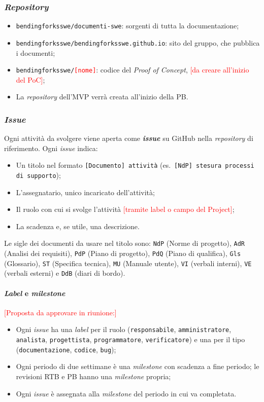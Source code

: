 \documentclass[12pt,a4paper]{article}
\newcommand{\ph}[1]{\textcolor{red}{[#1]}}
\newcommand{\tightlist}{\setlength{\itemsep}{1pt}\setlength{\parskip}{0pt}}
\begin{document}
\subsubsection{\emph{Repository}}\label{sec:repository}
\begin{itemize}
\tightlist
\item \texttt{bendingforksswe/documenti-swe}: sorgenti di tutta la documentazione;
\item \texttt{bendingforksswe/bendingforksswe.github.io}: sito del gruppo, che pubblica i documenti;
\item \texttt{bendingforksswe/\ph{nome}}: codice del \emph{Proof of Concept}, \ph{da creare all'inizio del PoC};
\item La \emph{repository} dell'MVP verrà creata all'inizio della PB.
\end{itemize}

\subsubsection{\emph{Issue}}\label{sec:issue}
Ogni attività da svolgere viene aperta come \textbf{\emph{issue}} su GitHub nella \emph{repository} di riferimento. Ogni \emph{issue} indica:
\begin{itemize}
\tightlist
\item Un titolo nel formato \texttt{[Documento] attività} (es.\ \texttt{[NdP] stesura processi di supporto});
\item L'assegnatario, unico incaricato dell'attività;
\item Il ruolo con cui si svolge l'attività \ph{tramite label o campo del Project};
\item La scadenza e, se utile, una descrizione.
\end{itemize}
Le sigle dei documenti da usare nel titolo sono: \texttt{NdP} (Norme di progetto), \texttt{AdR} (Analisi dei requisiti), \texttt{PdP} (Piano di progetto), \texttt{PdQ} (Piano di qualifica), \texttt{Gls} (Glossario), \texttt{ST} (Specifica tecnica), \texttt{MU} (Manuale utente), \texttt{VI} (verbali interni), \texttt{VE} (verbali esterni) e \texttt{DdB} (diari di bordo).

\paragraph{\emph{Label} e \emph{milestone}}
\ph{Proposta da approvare in riunione:}
\begin{itemize}
\tightlist
\item Ogni \emph{issue} ha una \emph{label} per il ruolo (\texttt{responsabile}, \texttt{amministratore}, \texttt{analista}, \texttt{progettista}, \texttt{programmatore}, \texttt{verificatore}) e una per il tipo (\texttt{documentazione}, \texttt{codice}, \texttt{bug});
\item Ogni periodo di due settimane è una \emph{milestone} con scadenza a fine periodo; le revisioni RTB e PB hanno una \emph{milestone} propria;
\item Ogni \emph{issue} è assegnata alla \emph{milestone} del periodo in cui va completata.
\end{itemize}
\end{document}

